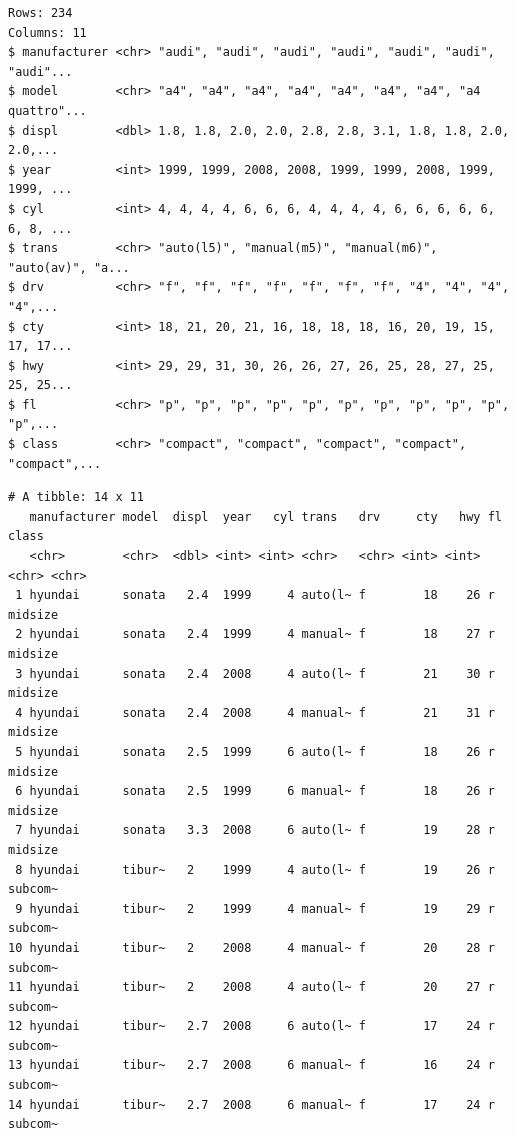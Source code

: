 \documentclass[
  11pt,
]{krantz}
\newenvironment{Shaded}{\begin{snugshade}}{\end{snugshade}}
\newcommand{\CommentTok}[1]{\textcolor[rgb]{0.37,0.37,0.37}{\textit{#1}}}
\newcommand{\KeywordTok}[1]{\textcolor[rgb]{0.27,0.27,0.27}{\textbf{#1}}}
\newcommand{\NormalTok}[1]{#1}
\newcommand{\OperatorTok}[1]{\textcolor[rgb]{0.43,0.43,0.43}{\textbf{#1}}}
\newcommand{\StringTok}[1]{\textcolor[rgb]{0.5,0.5,0.5}{#1}}
\begin{document}
\begin{verbatim}
Rows: 234
Columns: 11
$ manufacturer <chr> "audi", "audi", "audi", "audi", "audi", "audi", "audi"...
$ model        <chr> "a4", "a4", "a4", "a4", "a4", "a4", "a4", "a4 quattro"...
$ displ        <dbl> 1.8, 1.8, 2.0, 2.0, 2.8, 2.8, 3.1, 1.8, 1.8, 2.0, 2.0,...
$ year         <int> 1999, 1999, 2008, 2008, 1999, 1999, 2008, 1999, 1999, ...
$ cyl          <int> 4, 4, 4, 4, 6, 6, 6, 4, 4, 4, 4, 6, 6, 6, 6, 6, 6, 8, ...
$ trans        <chr> "auto(l5)", "manual(m5)", "manual(m6)", "auto(av)", "a...
$ drv          <chr> "f", "f", "f", "f", "f", "f", "f", "4", "4", "4", "4",...
$ cty          <int> 18, 21, 20, 21, 16, 18, 18, 18, 16, 20, 19, 15, 17, 17...
$ hwy          <int> 29, 29, 31, 30, 26, 26, 27, 26, 25, 28, 27, 25, 25, 25...
$ fl           <chr> "p", "p", "p", "p", "p", "p", "p", "p", "p", "p", "p",...
$ class        <chr> "compact", "compact", "compact", "compact", "compact",...
\end{verbatim}

\begin{Shaded}
\end{Shaded}

\begin{verbatim}
# A tibble: 14 x 11
   manufacturer model  displ  year   cyl trans   drv     cty   hwy fl    class  
   <chr>        <chr>  <dbl> <int> <int> <chr>   <chr> <int> <int> <chr> <chr>  
 1 hyundai      sonata   2.4  1999     4 auto(l~ f        18    26 r     midsize
 2 hyundai      sonata   2.4  1999     4 manual~ f        18    27 r     midsize
 3 hyundai      sonata   2.4  2008     4 auto(l~ f        21    30 r     midsize
 4 hyundai      sonata   2.4  2008     4 manual~ f        21    31 r     midsize
 5 hyundai      sonata   2.5  1999     6 auto(l~ f        18    26 r     midsize
 6 hyundai      sonata   2.5  1999     6 manual~ f        18    26 r     midsize
 7 hyundai      sonata   3.3  2008     6 auto(l~ f        19    28 r     midsize
 8 hyundai      tibur~   2    1999     4 auto(l~ f        19    26 r     subcom~
 9 hyundai      tibur~   2    1999     4 manual~ f        19    29 r     subcom~
10 hyundai      tibur~   2    2008     4 manual~ f        20    28 r     subcom~
11 hyundai      tibur~   2    2008     4 auto(l~ f        20    27 r     subcom~
12 hyundai      tibur~   2.7  2008     6 auto(l~ f        17    24 r     subcom~
13 hyundai      tibur~   2.7  2008     6 manual~ f        16    24 r     subcom~
14 hyundai      tibur~   2.7  2008     6 manual~ f        17    24 r     subcom~
\end{verbatim}
\end{document}
